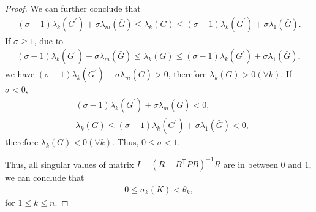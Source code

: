 \documentclass[letterpaper, 10 pt, conference]{ieeeconf}  %
\newcommand{\transpose}{\mathsf{T}}
\begin{document}
\begin{proof}
     We can further conclude that
     \begin{align}
         (\sigma-1)\lambda_{k}(G^{'})+\sigma\lambda_{m}(\bar{G}) \leq \lambda_{k}(G) \leq (\sigma-1)\lambda_{k}(G^{'})+\sigma\lambda_{1}(\bar{G}).
     \end{align}
     If $\sigma \geq 1$, due to
     \begin{align}
         (\sigma-1)\lambda_{k}(G^{'})+\sigma\lambda_{m}(\bar{G}) \leq \lambda_{k}(G) \leq (\sigma-1)\lambda_{k}(G^{'})+\sigma\lambda_{1}(\bar{G}),
     \end{align}
     we have $(\sigma-1)\lambda_{k}(G^{'})+\sigma\lambda_{m}(\bar{G}) > 0$,
     therefore $\lambda_{k}(G) > 0(\forall k)$. If $\sigma < 0$, 
     \begin{align*}
         &(\sigma-1)\lambda_{k}(G^{'})+\sigma\lambda_{m}(\bar{G}) < 0,\\
         &\lambda_{k}(G) \leq (\sigma-1)\lambda_{k}(G^{'})+\sigma\lambda_{1}(\bar{G}) < 0,
     \end{align*}
     therefore $\lambda_{k}(G) < 0(\forall k)$. Thus, $0 \leq \sigma < 1$.

    Thus, all singular values of matrix $I - (R+B^{\transpose}PB)^{-1}R$ are in between 0 and 1, we can conclude that
    \begin{align}
        0 \leq \sigma_{k}(K) < \theta_{k},
    \end{align}
    for $1\leq k \leq n$.
    

\end{proof}
\end{document}
